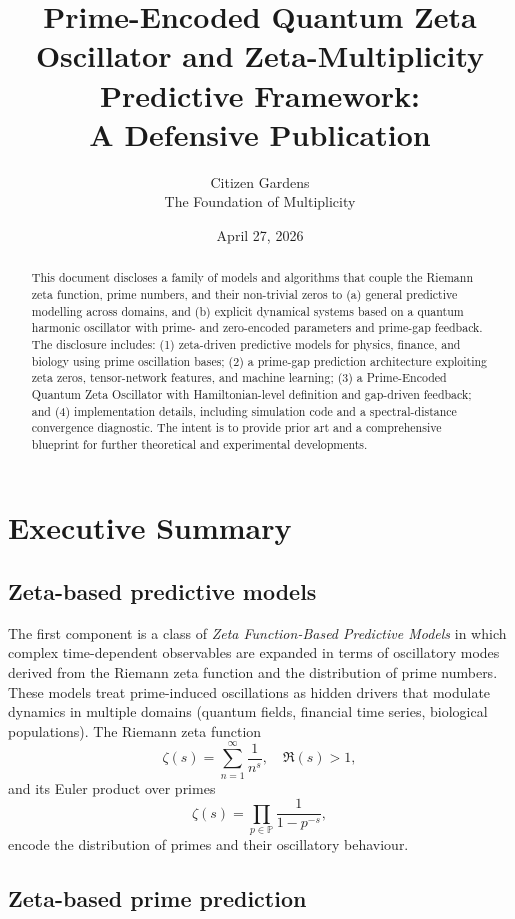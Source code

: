 \documentclass[11pt]{article}
\title{Prime-Encoded Quantum Zeta Oscillator and Zeta-Multiplicity Predictive Framework:\\
A Defensive Publication}
\author{Citizen Gardens \\ The Foundation of Multiplicity}
\date{April 27, 2026}
\begin{document}
\maketitle

\begin{abstract}
This document discloses a family of models and algorithms that couple the Riemann zeta function, prime numbers, and their non-trivial zeros to (a) general predictive modelling across domains, and (b) explicit dynamical systems based on a quantum harmonic oscillator with prime- and zero-encoded parameters and prime-gap feedback. The disclosure includes: (1) zeta-driven predictive models for physics, finance, and biology using prime oscillation bases; (2) a prime-gap prediction architecture exploiting zeta zeros, tensor-network features, and machine learning; (3) a Prime-Encoded Quantum Zeta Oscillator with Hamiltonian-level definition and gap-driven feedback; and (4) implementation details, including simulation code and a spectral-distance convergence diagnostic. The intent is to provide prior art and a comprehensive blueprint for further theoretical and experimental developments.
\end{abstract}

\tableofcontents
\newpage
\section{Executive Summary}

\subsection{Zeta-based predictive models}

The first component is a class of \emph{Zeta Function-Based Predictive Models} in which complex time-dependent observables are expanded in terms of oscillatory modes derived from the Riemann zeta function and the distribution of prime numbers.\cite{file1} These models treat prime-induced oscillations as hidden drivers that modulate dynamics in multiple domains (quantum fields, financial time series, biological populations). The Riemann zeta function
\[
\zeta(s) = \sum_{n=1}^{\infty} \frac{1}{n^{s}},\quad \Re(s) > 1,
\]
and its Euler product over primes
\[
\zeta(s) = \prod_{p \in \mathbb{P}} \frac{1}{1 - p^{-s}},
\]
encode the distribution of primes and their oscillatory behaviour.\cite{file1}

\subsection{Zeta-based prime prediction}
\end{document}
